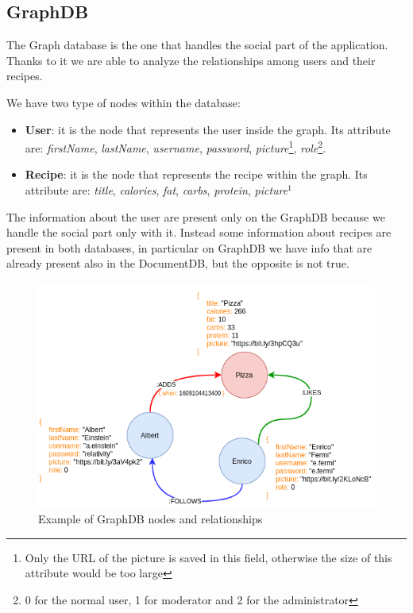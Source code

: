 \documentclass[a4paper]{report}
\begin{document}
\subsection{GraphDB}
The Graph database is the one that handles the social part of the application. Thanks to it we are able to analyze the relationships among users and their recipes.

\noindent We have two type of nodes within the database:
\begin{itemize}
	\item \textbf{User}: it is the node that represents the user inside the graph. Its attribute are: \emph{firstName}, \emph{lastName}, \emph{username}, \emph{password}, \emph{picture}\footnote{Only the URL of the picture is saved in this field, otherwise the size of this attribute would be too large}, \emph{role}\footnote{0 for the normal user, 1 for moderator and 2 for the administrator}.
	
	\item \textbf{Recipe}: it is the node that represents the recipe within the graph. Its attribute are: \emph{title}, \emph{calories}, \emph{fat}, \emph{carbs}, \emph{protein}, \emph{picture}$^1$
\end{itemize}

\noindent The information about the user are present only on the GraphDB because we handle the social part only with it. Instead some information about recipes are present in both databases, in particular on GraphDB we have info that are already present also in the DocumentDB, but the opposite is not true.

\begin{figure}[htpb]
	\centering
	\includegraphics[scale=0.6]{img/graphDbModel.png}
	\caption{Example of GraphDB nodes and relationships}
	\label{img: Example of GraphDB nodes and relationships}
\end{figure}
\end{document}
